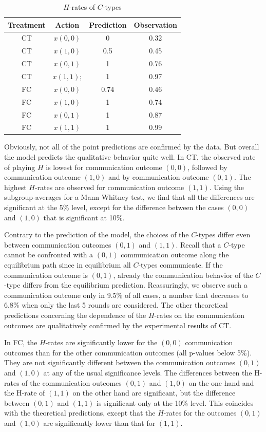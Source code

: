 \documentclass[12pt]{article}
\theoremstyle{break}
\begin{document}
\begin{table}[h!]
\begin{center}
	\begin{tabular}{c c c c}
			Treatment & Action & Prediction & Observation \\
			\hline
			CT & $x(0,0)$ 	& 0	& 0.32\\
			CT & $x(1,0)$	& 0.5 & 0.45\\ 
            CT & $x(0,1)$  	& 1	& 0.76\\
			CT & $x(1,1)$; 	& 1 & 0.97\\ 
			\hline
			FC &  $x(0,0)$ 	& 0.74	& 0.46\\ 
			FC &  $x(1,0)$ & 1 & 0.74\\ 
			FC &  $x(0,1)$ & 1 & 0.87\\
			FC &  $x(1,1)$ & 1 &  0.99\\ 
			\hline
	\end{tabular}
	\end{center}
	\label{H-rates of $C$-types}
	\caption{$H$-rates of $C$-types}	
\end{table}

Obviously, not all of the point predictions are confirmed by the data. But overall the model predicts the qualitative behavior quite well. In CT, the observed rate of playing $H$ is lowest for communication outcome $(0,0)$, followed by communication outcome $(1,0)$ and by communication outcome $(0,1)$. The highest $H$-rates are observed for communication outcome $(1,1)$. Using the subgroup-averages for a Mann Whitney test, we find that all the differences are significant at the 5\% level, except for the difference between the cases $(0,0)$ and $(1,0)$ that is significant at 10\%. 

Contrary to the prediction of the model, the choices of the $C$-types differ even between communication outcomes $(0,1)$ and $(1,1)$. Recall that a $C$-type cannot be confronted with a $(0,1)$ communication outcome along the equilibrium path since in equilibrium all $C$-types communicate. If the communication outcome is $(0,1)$, already the communication behavior of the $C$-type differs from the equilibrium prediction. Reassuringly, we observe such a communication outcome only in 9.5\% of all cases, a number that decreases to 6.8\% when only the last 5 rounds are considered.
The other theoretical predictions concerning the dependence of the $H$-rates on the communication outcomes are qualitatively confirmed by the experimental results of CT. 

In FC, the $H$-rates are significantly lower for the $(0,0)$ communication outcomes than for the other communication outcomes (all p-values below 5\%). They are not significantly different between the communication outcomes $(0,1)$ and $(1,0)$ at any of the usual significance levels. The differences between the H-rates of the communication outcomes $(0,1)$ and $(1,0)$ on the one hand and the H-rate of $(1,1)$ on the other hand are significant, but the difference between $(0,1)$ and $(1,1)$ is significant only at the 10\% level. This coincides with the theoretical predictions, except that the $H$-rates for the outcomes $(0,1)$ and $(1,0)$ are significantly lower than that for $(1,1)$.
\end{document}
